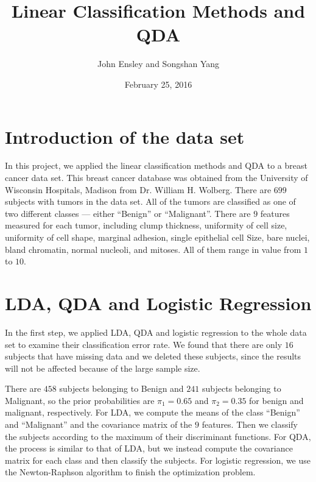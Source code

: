 \documentclass[12pt]{article}
\begin{document}
\renewcommand{\baselinestretch}{1.5}

\title{Linear Classification Methods and QDA}

\author{\sc John Ensley and Songshan Yang}

\date{February 25, 2016}
\maketitle
\section{Introduction of the data set}

In this project, we applied the linear classification methods and QDA to a breast cancer data set. This breast cancer database was obtained from the University of Wisconsin Hospitals, Madison from Dr. William H. Wolberg.
There are $699$ subjects with tumors in the data set. All of the tumors are classified as one of two different classes --- either ``Benign'' or ``Malignant''. There are $9$ features measured for each tumor, including clump thickness, uniformity of cell size, uniformity of cell shape, marginal adhesion, single epithelial cell Size, bare nuclei, bland chromatin, normal nucleoli, and mitoses. All of them range in value from $1$ to $10$.



\section{LDA, QDA and Logistic Regression}
In the first step, we applied LDA, QDA and logistic regression to the whole data set to examine their classification error rate. We found that there are only $16$ subjects that have missing data and we deleted these subjects, since the results will not be affected because of the large sample size. 

There are $458$ subjects belonging to Benign and $241$ subjects belonging to Malignant, so the prior probabilities are $\pi_1=0.65$ and $\pi_2=0.35$ for benign and malignant, respectively. For LDA, we compute the means of the class ``Benign'' and ``Malignant'' and the covariance matrix of the $9$ features. Then we classify the subjects according to the maximum of their discriminant functions. For QDA, the process is similar to that of LDA, but we instead compute the covariance matrix for each class and then classify the subjects. For logistic regression, we use the Newton-Raphson algorithm to finish the optimization problem.   
\end{document}
